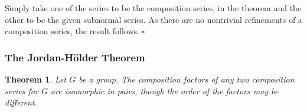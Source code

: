 \documentclass[10pt]{article}
\newtheorem{theorem}{Theorem}[section]
\newenvironment{proof}[1][Proof]{\begin{trivlist}
\item[\hskip \labelsep {\itshape #1}]}{\end{trivlist}}
\begin{document}
\begin{proof}
Simply take one of the series to be the composition series, in the theorem and the other to be the given subnormal series. As there are no nontrivial refinements of a composition series, the result follows. $\square$
\end{proof}

\subsubsection{The Jordan-H\"{o}lder Theorem}

\begin{theorem}
Let $G$ be a group. The composition factors of any two composition series for $G$ are isomorphic in pairs, though the order of the factors may be different.
\end{theorem}
\end{document}
